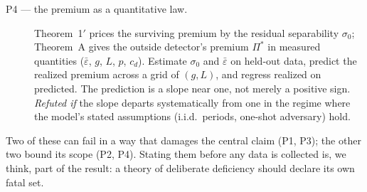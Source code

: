 \begin{description}
\item[P4 --- the premium as a quantitative law.] Theorem~1$'$ prices the
  surviving premium by the residual separability $\sigma_0$;
  Theorem~A gives the outside detector's premium $\Pi^*$ in measured
  quantities ($\bar\varepsilon$, $g$, $L$, $p$, $c_d$). Estimate $\sigma_0$
  and $\bar\varepsilon$ on held-out data, predict the realized premium
  across a grid of $(g, L)$, and regress realized on predicted. The
  prediction is a slope near one, not merely a positive sign.
  \emph{Refuted if} the slope departs systematically from one in the regime
  where the model's stated assumptions (i.i.d.\ periods, one-shot
  adversary) hold.
\end{description}

\noindent Two of these can fail in a way that damages the central claim
(P1, P3); the other two bound its scope (P2, P4). Stating them before any
data is collected is, we think, part of the result: a theory of deliberate
deficiency should declare its own fatal set.

%
